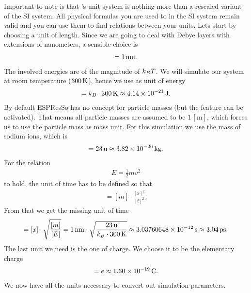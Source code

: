 Important to note is that \ES{}'s unit system is nothing more than a rescaled variant of the SI system. All physical formulas you are used to in the SI system remain valid and you can use them to find relations between your units. Lets start by choosing a unit of length. Since we are going to deal with Debye layers with extensions of nanometers, a sensible choice is
%
\begin{align*}
[x]=1\U{nm}.
\end{align*}
%
The involved energies are of the magnitude of $k_{B}T$. We will simulate our system at room temperature ($300\,\mathrm{K}$), hence we use as unit of energy
\begin{align*}
[E]=k_B\cdot300\U K\approx4.14\E{-21}\U J.
\end{align*}
%
By default ESPResSo has no concept for particle masses (but the feature can be activated). That means all particle masses are assumed to be $1\,[\mathrm{m}]$, which forces us to use the particle mass as mass unit. For this simulation we use the mass of sodium ions, which is
\begin{align*}
[m]=23\U u\approx3.82\E{-26}\U{kg}.
\end{align*}
%
For the relation
\begin{align*}
E=\frac 1 2 mv^2
\end{align*}
%
to hold, the unit of time has to be defined so that
\begin{align*}
[E]=[m]\cdot\frac{[x]^2}{[t]^2}.
\end{align*}
%
From that we get the missing unit of time
\begin{align*}
[t]=[x]\cdot\sqrt{\frac{[m]}{[E]}}=1\U{nm}\cdot\sqrt{\frac{23\U u}{k_B\cdot 300\U K}}\approx 3.03760648\E{-12}\U s\approx3.04\U{ps}.
\end{align*}
%
The last unit we need is the one of charge. We choose it to be the elementary charge
\begin{align*}
[q]=e\approx1.60\E{-19}\U C.
\end{align*}
%
We now have all the units necessary to convert out simulation parameters.

